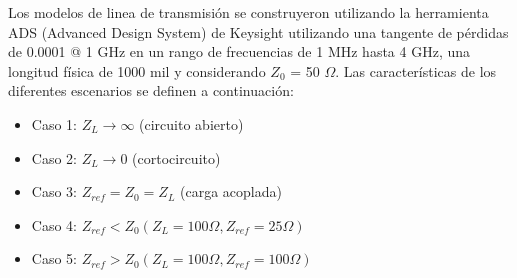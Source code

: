 \documentclass{article}   %
\theoremstyle{mytheoremstyle}
\theoremstyle{mytheoremstyle}
\theoremstyle{myproblemstyle}
\begin{document}
\begin{minipage}{0.49\textwidth}
          Los modelos de linea de transmisión se construyeron utilizando la herramienta ADS (Advanced Design System) de Keysight utilizando
          una tangente de pérdidas de 0.0001 @ 1 GHz en un rango de frecuencias de 1 MHz hasta 4 GHz, una longitud física de 1000 mil y considerando $Z_0$ = 50 $\Omega$. 
          Las características de los diferentes escenarios se definen a continuación:
          \vspace{1cm}
        \begin{itemize}
            \item Caso 1: $Z_{L} \to \infty$ (circuito abierto)
            \item Caso 2: $Z_{L} \to 0$ (cortocircuito)
            \item Caso 3: $Z_{ref} = Z_{0} = Z_{L}$ (carga acoplada)
            \item Caso 4: $Z_{ref} < Z_{0} (Z_{L} = 100 \Omega, Z_{ref} = 25 \Omega)$ 
            \item Caso 5: $Z_{ref} > Z_{0} (Z_{L} = 100 \Omega, Z_{ref} = 100 \Omega)$ 
        \end{itemize}
    \end{minipage}
    \hspace{0.38 cm}
\end{document}
